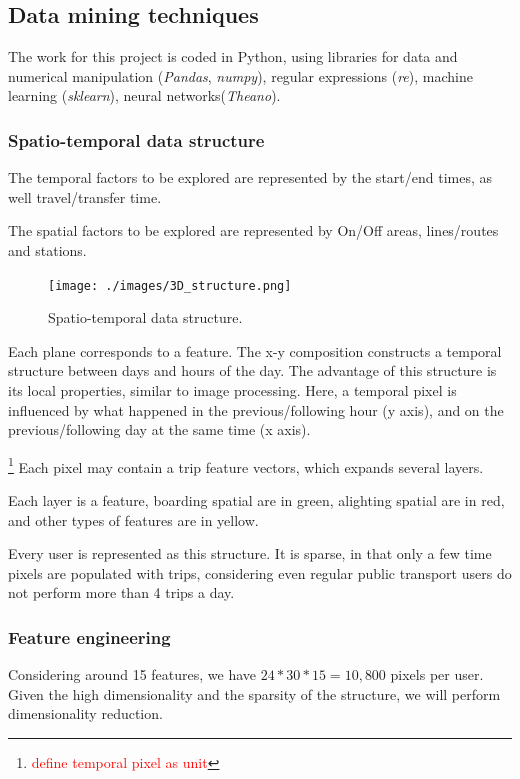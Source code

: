 \documentclass{article}
\newcommand{\selfnote}[1]{\footnote{\textcolor{red}{#1}}}
\begin{document}
\subsection{Data mining techniques}
The work for this project is coded in Python, using libraries for data and numerical manipulation (\textit{Pandas}, \textit{numpy}), regular expressions (\textit{re}), machine learning (\textit{sklearn}), neural networks(\textit{Theano}).

\subsubsection{Spatio-temporal data structure}
The temporal factors to be explored are represented by the start/end times, as well travel/transfer time.

The spatial factors to be explored are represented by On/Off areas, lines/routes and stations. 

\begin{figure}[H]
  \centering
  \texttt{[image: ./images/3D\_structure.png]}
  \caption{Spatio-temporal data structure.}
  \label{fig:preprocessing/3D_structure}
\end{figure}

Each plane corresponds to a feature. The x-y composition constructs a temporal structure between days and hours of the day. The advantage of this structure is its local properties, similar to image processing. Here, a temporal pixel is influenced by what happened in the previous/following hour (y axis), and on the previous/following day at the same time (x axis).

\selfnote{define temporal pixel as unit}
Each pixel may contain a trip feature vectors, which expands several layers.

Each layer is a feature, boarding spatial are in green, alighting spatial are in red, and other types of features are in yellow. 

Every user is represented as this structure. It is sparse, in that only a few time pixels are populated with trips, considering even regular public transport users do not perform more than 4 trips a day. 


\subsubsection{Feature engineering}
Considering around 15 features, we have $24 * 30 * 15 = 10,800$ pixels per user. Given the high dimensionality and the sparsity of the structure, we will perform dimensionality reduction. 
\end{document}
